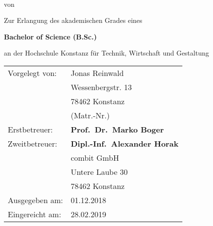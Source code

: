\begin{titlepage}
    
    \AddToShipoutPicture*{\BackgroundImgTitelPage}
    
    \vspace*{12\bigskipamount}
    
    {
        \makeatletter
        \fboxsep=0pt
        \colorbox{htwg-white}{\begin{minipage}[t]{145mm}
            \begin{flushleft}
                \color{htwg-teal}\LARGE{\@report@typetext}
                \\
                \color{htwg-teal}\Large\textbf{\@title}
            \end{flushleft}
        \end{minipage}}
        \makeatother
    }
    
    \bigskip
    \bigskip

    von
    
    \bigskip
    
    {
        \makeatletter
        \large\bfseries\@author{} %
        \makeatother
    }
    
    \vfill
    
    Zur Erlangung des akademischen Grades eines
    
    \bigskip
    
    {\bfseries Bachelor of Science (B.Sc.)}
    
    \bigskip
    
    an der Hochschule Konstanz für Technik, Wirtschaft und Gestaltung
    
    \vfill
    
    \begingroup
    \renewcommand*{\arraystretch}{1}
    {
        \makeatletter
        \begin{tabular}{>{\raggedright\arraybackslash}p{3.5cm}l}
            Vorgelegt von: & Jonas Reinwald \\
                & Wessenbergstr. 13 \\
                & 78462 Konstanz \\
                & \@student@number{} (Matr.-Nr.) \\
            Erstbetreuer: & \textbf{Prof.\ Dr.\ Marko Boger} \\
            Zweitbetreuer: & \textbf{Dipl.-Inf.\ Alexander Horak} \\ 
                & combit GmbH \\
                & Untere Laube 30 \\
                & 78462 Konstanz \\
            Ausgegeben am: & 01.12.2018 \\
            Eingereicht am: & 28.02.2019 \\
        \end{tabular}
        \makeatother
    }
    \endgroup
    
    \bigskip
    
    \end{titlepage}
